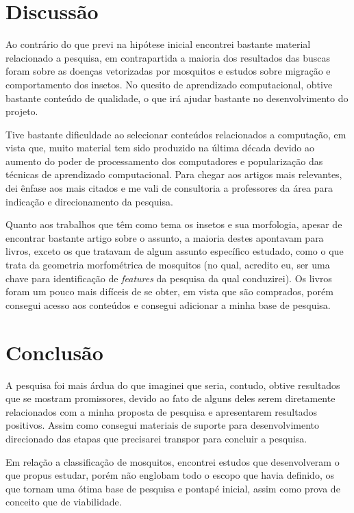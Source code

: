 \documentclass[conference]{IEEEtran}
\begin{document}

\section{Discussão}
Ao contrário do que previ na hipótese inicial encontrei bastante material relacionado a pesquisa, em contrapartida a maioria dos resultados das buscas foram sobre as doenças vetorizadas por mosquitos e estudos sobre migração e comportamento dos insetos. No quesito de aprendizado computacional, obtive bastante conteúdo de qualidade, o que irá ajudar bastante no desenvolvimento do projeto.

Tive bastante dificuldade ao selecionar conteúdos relacionados a computação, em vista que, muito material tem sido produzido na última década devido ao aumento do poder de processamento dos computadores e popularização das técnicas de aprendizado computacional. Para chegar aos artigos mais relevantes, dei ênfase aos mais citados e me vali de consultoria a professores da área para indicação e direcionamento da pesquisa.

Quanto aos trabalhos que têm como tema os insetos e sua morfologia, apesar de encontrar bastante artigo sobre o assunto, a maioria destes apontavam para livros, exceto os que tratavam de algum assunto específico estudado, como o \cite{Lorenz2017} que trata da geometria morfométrica de mosquitos (no qual, acredito eu, ser uma chave para identificação de \emph{features} da pesquisa da qual conduzirei). Os livros foram um pouco mais difíceis de se obter, em vista que são comprados, porém consegui acesso aos conteúdos e consegui adicionar a minha base de pesquisa.


\section{Conclusão}
A pesquisa foi mais árdua do que imaginei que seria, contudo, obtive resultados que se mostram promissores, devido ao fato de alguns deles serem diretamente relacionados com a minha proposta de pesquisa e apresentarem resultados positivos. Assim como consegui materiais de suporte para desenvolvimento direcionado das etapas que precisarei transpor para concluir a pesquisa.

Em relação a classificação de mosquitos, encontrei estudos que desenvolveram o que propus estudar, porém não englobam todo o escopo que havia definido, os que tornam uma ótima base de pesquisa e pontapé inicial, assim como prova de conceito que de viabilidade. 
\end{document}
